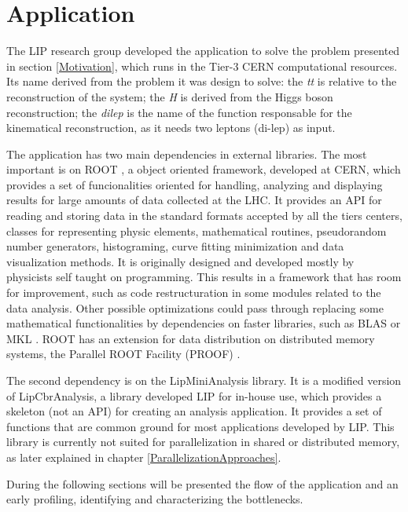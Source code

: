 \chapter{\tth Application}
\label{Application}

The LIP research group developed the \tth application to solve the problem presented in section \ref{Motivation}, which runs in the Tier-3 CERN computational resources. Its name derived from the problem it was design to solve: the \textit{tt} is relative to the reconstruction of the \ttbar system; the \textit{H} is derived from the Higgs boson reconstruction; the \textit{dilep} is the name of the function responsable for the kinematical reconstruction, as it needs two leptons (di-lep) as input.

The application has two main dependencies in external libraries. The most important is on ROOT \cite{CERN:ROOT}, a object oriented framework, developed at CERN, which provides a set of funcionalities oriented for handling, analyzing and displaying results for large amounts of data collected at the LHC. It provides an API for reading and storing data in the standard formats accepted by all the tiers centers, classes for representing physic elements, mathematical routines, pseudorandom number generators, histograming, curve fitting minimization and data visualization methods. It is originally designed and developed mostly by physicists self taught on programming. This results in a framework that has room for improvement, such as code restructuration in some modules related to the data analysis. Other possible optimizations could pass through replacing some mathematical functionalities by dependencies on faster libraries, such as BLAS \cite{BLAS} or MKL \cite{MKL}. ROOT has an extension for data distribution on distributed memory systems, the Parallel ROOT Facility (PROOF) \cite{CERN:PROOF}.

The second dependency is on the LipMiniAnalysis library. It is a modified version of LipCbrAnalysis, a library developed LIP for in-house use, which provides a skeleton (not an API) for creating an analysis application. It provides a set of functions that are common ground for most applications developed by LIP. This library is currently not suited for parallelization in shared or distributed memory, as later explained in chapter \ref{ParallelizationApproaches}.

During the following sections will be presented the flow of the application and an early profiling, identifying and characterizing the bottlenecks.

